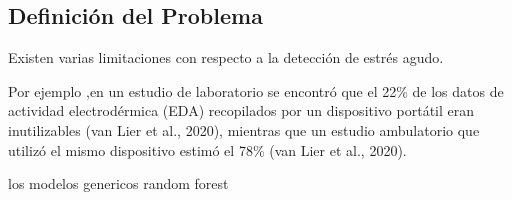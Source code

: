 \subsection{Definición del Problema}








Existen varias  limitaciones con respecto a la detección de  estrés agudo.


Por ejemplo ,en un estudio de laboratorio se  encontró que el 22\% de
los datos de actividad electrodérmica (EDA) recopilados por un dispositivo
portátil eran inutilizables (van Lier et al., 2020), mientras que un estudio
ambulatorio que utilizó el mismo dispositivo estimó el 78\% (van
Lier et al., 2020).

los modelos genericos random forest

